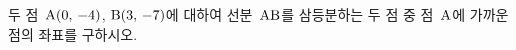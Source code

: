 두 점~$\mathrm{A}(0,\mkern3mu -4)$, $\mathrm{B}(3,\mkern3mu -7)$에 대하여 선분~$\mathrm{AB}$를 삼등분하는 두 점 중 점~$\mathrm{A}$에 가까운 점의 좌표를 구하시오.
